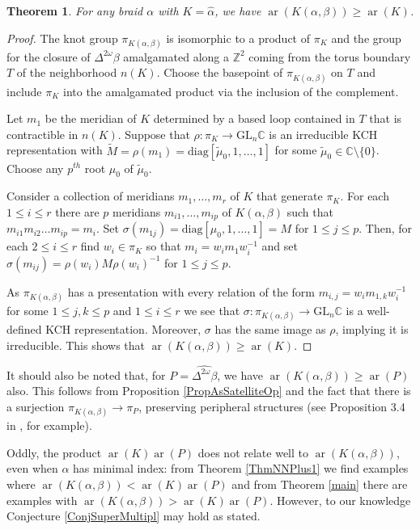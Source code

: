 \documentclass[11pt]{amsart}
\def\s{{\sigma}}
\def\ar{\operatorname{ar}}
\newtheorem{thm}{Theorem}[section]
\theoremstyle{definition}
\begin{document}
\begin{thm}For any braid $\alpha$ with $K=\hat{\alpha}$, we have $\ar(K(\alpha,\beta)) \ge \ar(K)$.
\label{ThmCompanionRank}
\end{thm}
\begin{proof}The knot group $\pi_{K(\alpha,\beta)}$ is isomorphic to a product of $\pi_K$ and the group for the closure of $\Delta^{2\omega}\beta$ amalgamated along a $\mathbb Z^2$ coming from the torus boundary $T$ of the neighborhood $n(K)$. Choose the basepoint of $\pi_{K(\alpha,\beta)}$ on $T$ and include $\pi_K$ into the amalgamated product via the inclusion of the complement.

Let $m_1$ be the meridian of $K$ determined by a based loop contained in $T$ that is contractible in $n(K)$. Suppose that $\rho:\pi_K\to\text{GL}_n\mathbb C$ is an irreducible KCH representation with $\widetilde M = \rho(m_1) = \text{diag}[\widetilde\mu_0,1,\ldots,1]$ for some $\widetilde\mu_0\in\mathbb C\setminus\{0\}$. Choose any $p^{th}$ root $\mu_0$ of $\widetilde\mu_0$. 

Consider a collection of meridians $m_1,\ldots,m_r$ of $K$ that generate $\pi_K$. For each $1\le i\le r$ there are $p$ meridians $m_{i1},\ldots,m_{ip}$ of $K(\alpha,\beta)$ such that $m_{i1}m_{i2}\ldots m_{ip} = m_i$. Set $\s(m_{1j}) = \text{diag}[\mu_0,1,\ldots,1] = M$ for $1\le j\le p$. Then, for each $2\le i\le r$ find $w_i\in\pi_K$ so that $m_i = w_im_1w_i^{-1}$ and set $\s(m_{ij}) = \rho(w_i)M\rho(w_i)^{-1}$ for $1\le j\le p$.

As $\pi_{K(\alpha,\beta)}$ has a presentation with every relation of the form $m_{i,j} = w_im_{1,k}w_i^{-1}$ for some $1\le j, k\le p$ and $1\le i\le r$ we see that $\s:\pi_{K(\alpha,\beta)}\to\text{GL}_n\mathbb C$ is a well-defined KCH representation. Moreover, $\s$ has the same image as $\rho$, implying it is irreducible. This shows that $\ar(K(\alpha,\beta))\ge \ar(K)$.
\end{proof}

It should also be noted that, for $P=\hat{\Delta^{2\omega}\beta}$, we have $\ar(K(\alpha,\beta))\ge \ar(P)$ also. This follows from Proposition \ref{PropAsSatelliteOp} and the fact that there is a surjection $\pi_{K(\alpha,\beta)}\to\pi_P$, preserving peripheral structures (see Proposition 3.4 in \cite{SW}, for example). 

Oddly, the product $\ar(K)\ar(P)$ does not relate well to $\ar(K(\alpha,\beta))$, even when $\alpha$ has minimal index: from Theorem \ref{ThmNNPlus1} we find examples where $\ar(K(\alpha,\beta))<\ar(K)\ar(P)$ and from Theorem \ref{main} there are examples with $\ar(K(\alpha,\beta))>\ar(K)\ar(P)$. However, to our knowledge Conjecture \ref{ConjSuperMultipl} may hold as stated. 
\end{document}
